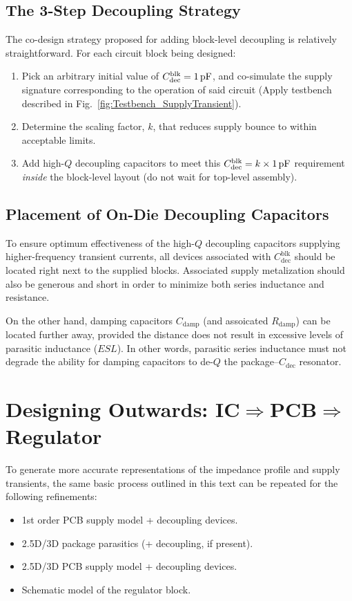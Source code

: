 \subsection{The 3-Step Decoupling Strategy}
\par The co-design strategy proposed for adding block-level decoupling is
relatively straightforward. For each circuit block being designed:
%
\begin{enumerate}[noitemsep]
\item Pick an arbitrary initial value of $C_\mathrm{dec}^\mathrm{blk}=1\mathrm{\,pF}$, and co-simulate the supply signature corresponding to the operation of said circuit (Apply testbench described in Fig.~\ref{fig:Testbench_SupplyTransient}).
\item Determine the scaling factor, $k$, that reduces supply bounce to within acceptable limits.
\item Add high-$Q$ decoupling capacitors to meet this $C_\mathrm{dec}^\mathrm{blk}=k\times 1\mathrm{\,pF}$ requirement \emph{inside} the block-level layout (do not wait for top-level assembly).
\end{enumerate}
%
\subsection{Placement of On-Die Decoupling Capacitors}
\par To ensure optimum effectiveness of the high-$Q$ decoupling capacitors
supplying higher-frequency transient currents, all devices associated with
$C_\mathrm{dec}^\mathrm{blk}$ should be located right next to the supplied
blocks. Associated supply metalization should also be generous and short in
order to minimize both series inductance and resistance.
%
\par On the other hand, damping capacitors $C_\mathrm{damp}$ (and assoicated
$R_\mathrm{damp}$) can be located further away, provided the distance does
not result in excessive levels of parasitic inductance ($ESL$). In other words,
parasitic series inductance must not degrade the ability for damping capacitors
to de-$Q$ the package--$C_\mathrm{dec}$ resonator.
%
\section{Designing Outwards: IC$\Rightarrow$PCB$\Rightarrow$Regulator}
\par To generate more accurate representations of the impedance profile and
supply transients, the same basic process outlined in this text can be
repeated for the following refinements:
%
\begin{itemize}[noitemsep]
\item 1st order PCB supply model + decoupling devices.
\item 2.5D/3D package parasitics (+ decoupling, if present).
\item 2.5D/3D PCB supply model + decoupling devices.
\item Schematic model of the regulator block.
\end{itemize}
%
